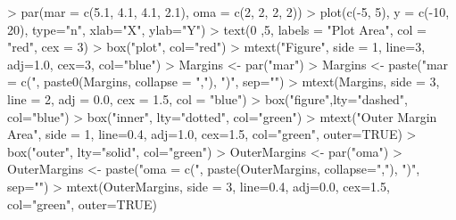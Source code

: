 \begin{Schunk}
\begin{Sinput}
> par(mar = c(5.1, 4.1, 4.1, 2.1), oma = c(2, 2, 2, 2))
> plot(c(-5, 5), y = c(-10, 20), type="n", xlab="X", ylab="Y")
> text(0 ,5, labels = "Plot Area", col = "red", cex = 3)
> box("plot", col="red")
> mtext("Figure", side = 1, line=3, adj=1.0, cex=3,   col="blue")
> Margins <- par("mar")
> Margins <- paste("mar = c(", paste0(Margins, collapse = ","), ")", sep="")
> mtext(Margins, side = 3, line = 2, adj = 0.0, cex = 1.5, col = "blue")
> box("figure",lty="dashed", col="blue")
> box("inner", lty="dotted", col="green")
> mtext("Outer Margin Area",
       side = 1, line=0.4, adj=1.0, cex=1.5, col="green", outer=TRUE)
> box("outer", lty="solid", col="green")
> OuterMargins <- par("oma")
> OuterMargins <-
         paste("oma = c(", paste(OuterMargins, collapse=","), ")", sep="")
> mtext(OuterMargins,
          side = 3, line=0.4, adj=0.0, cex=1.5, col="green", outer=TRUE)
\end{Sinput}
\end{Schunk}
